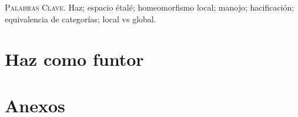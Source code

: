 \documentclass[letterpaper]{article} %
\date{}
\numberwithin{Tma}{section}
\numberwithin{Prop}{section}
\numberwithin{Def}{section}
\numberwithin{Lema}{section}
\numberwithin{Ejc}{section}
\numberwithin{Ejc}{section}
\renewenvironment{abstract}
{\small
   \list{}{%
      \setlength{\leftmargin}{1.4cm}%
      \setlength{\rightmargin}{\leftmargin}%
   }%
   \item\relax}
{\endlist}
\begin{document}
   
   \vspace{1cm}

   \begin{abstract}
      
        
      \vspace{0.3cm}
      \textsc{Palabras Clave.} Haz; espacio étalé; homeomorfismo local; manojo; hacificación; equivalencia de categorías; local vs global.
   \end{abstract}

   \vspace{1cm}

   \section{Haz como funtor}
      
   \section{Anexos}
      
\end{document}
